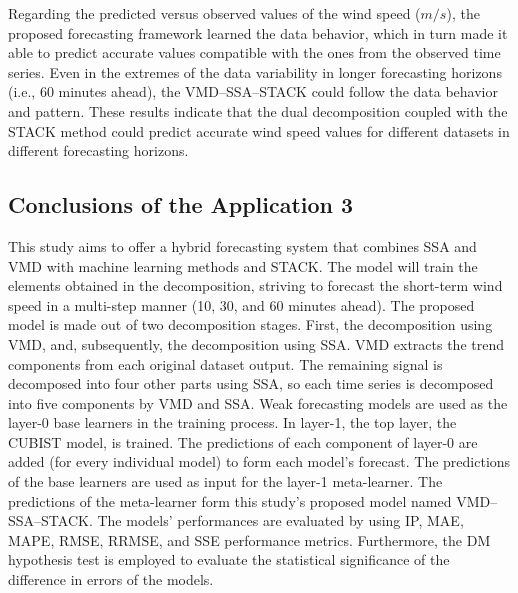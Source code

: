 Regarding the predicted versus observed values of the wind speed ($m/s$), the proposed forecasting framework learned the data behavior, which in turn made it able to predict accurate values compatible with the ones from the observed time series. Even in the extremes of the data variability in longer forecasting horizons (i.e., 60 minutes ahead), the \ac{VMD}--\ac{SSA}--\ac{STACK} could follow the data behavior and pattern. These results indicate that the dual decomposition coupled with the \ac{STACK} method could predict accurate wind speed values for different datasets in different forecasting horizons.

\subsection{Conclusions of the Application 3 \label{sec:conclusion}}

This study aims to offer a hybrid forecasting system that combines \ac{SSA} and \ac{VMD} with machine learning methods and \ac{STACK}. The model will train the elements obtained in the decomposition, striving to forecast the short-term wind speed in a multi-step manner (10, 30, and 60 minutes ahead). The proposed model is made out of two decomposition stages. First, the decomposition using \ac{VMD}, and, subsequently, the decomposition using \ac{SSA}. \ac{VMD} extracts the trend components from each original dataset output. The remaining signal is decomposed into four other parts using \ac{SSA}, so each time series is decomposed into five components by \ac{VMD} and \ac{SSA}. Weak forecasting models are used as the layer-0 base learners in the training process. In layer-1, the top layer, the \ac{CUBIST} model, is trained. The predictions of each component of layer-0 are added (for every individual model) to form each model's forecast. The predictions of the base learners are used as input for the layer-1 meta-learner. The predictions of the meta-learner form this study's proposed model named \ac{VMD}--\ac{SSA}--\ac{STACK}. The models' performances are evaluated by using \ac{IP}, \ac{MAE}, \ac{MAPE}, \ac{RMSE}, \ac{RRMSE}, and \ac{SSE} performance metrics. Furthermore, the \ac{DM} hypothesis test is employed to evaluate the statistical significance of the difference in errors of the models.

